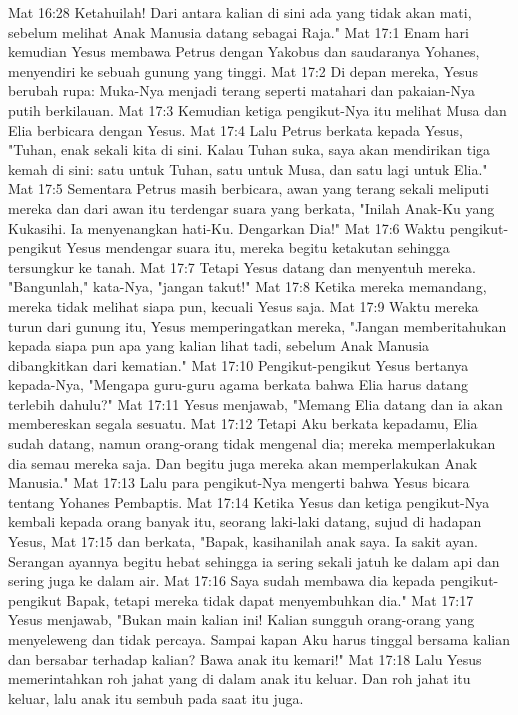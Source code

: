 Mat 16:28  Ketahuilah! Dari antara kalian di sini ada yang tidak akan mati, sebelum melihat Anak Manusia datang sebagai Raja."
Mat 17:1  Enam hari kemudian Yesus membawa Petrus dengan Yakobus dan saudaranya Yohanes, menyendiri ke sebuah gunung yang tinggi.
Mat 17:2  Di depan mereka, Yesus berubah rupa: Muka-Nya menjadi terang seperti matahari dan pakaian-Nya putih berkilauan.
Mat 17:3  Kemudian ketiga pengikut-Nya itu melihat Musa dan Elia berbicara dengan Yesus.
Mat 17:4  Lalu Petrus berkata kepada Yesus, "Tuhan, enak sekali kita di sini. Kalau Tuhan suka, saya akan mendirikan tiga kemah di sini: satu untuk Tuhan, satu untuk Musa, dan satu lagi untuk Elia."
Mat 17:5  Sementara Petrus masih berbicara, awan yang terang sekali meliputi mereka dan dari awan itu terdengar suara yang berkata, "Inilah Anak-Ku yang Kukasihi. Ia menyenangkan hati-Ku. Dengarkan Dia!"
Mat 17:6  Waktu pengikut-pengikut Yesus mendengar suara itu, mereka begitu ketakutan sehingga tersungkur ke tanah.
Mat 17:7  Tetapi Yesus datang dan menyentuh mereka. "Bangunlah," kata-Nya, "jangan takut!"
Mat 17:8  Ketika mereka memandang, mereka tidak melihat siapa pun, kecuali Yesus saja.
Mat 17:9  Waktu mereka turun dari gunung itu, Yesus memperingatkan mereka, "Jangan memberitahukan kepada siapa pun apa yang kalian lihat tadi, sebelum Anak Manusia dibangkitkan dari kematian."
Mat 17:10  Pengikut-pengikut Yesus bertanya kepada-Nya, "Mengapa guru-guru agama berkata bahwa Elia harus datang terlebih dahulu?"
Mat 17:11  Yesus menjawab, "Memang Elia datang dan ia akan membereskan segala sesuatu.
Mat 17:12  Tetapi Aku berkata kepadamu, Elia sudah datang, namun orang-orang tidak mengenal dia; mereka memperlakukan dia semau mereka saja. Dan begitu juga mereka akan memperlakukan Anak Manusia."
Mat 17:13  Lalu para pengikut-Nya mengerti bahwa Yesus bicara tentang Yohanes Pembaptis.
Mat 17:14  Ketika Yesus dan ketiga pengikut-Nya kembali kepada orang banyak itu, seorang laki-laki datang, sujud di hadapan Yesus,
Mat 17:15  dan berkata, "Bapak, kasihanilah anak saya. Ia sakit ayan. Serangan ayannya begitu hebat sehingga ia sering sekali jatuh ke dalam api dan sering juga ke dalam air.
Mat 17:16  Saya sudah membawa dia kepada pengikut-pengikut Bapak, tetapi mereka tidak dapat menyembuhkan dia."
Mat 17:17  Yesus menjawab, "Bukan main kalian ini! Kalian sungguh orang-orang yang menyeleweng dan tidak percaya. Sampai kapan Aku harus tinggal bersama kalian dan bersabar terhadap kalian? Bawa anak itu kemari!"
Mat 17:18  Lalu Yesus memerintahkan roh jahat yang di dalam anak itu keluar. Dan roh jahat itu keluar, lalu anak itu sembuh pada saat itu juga.
